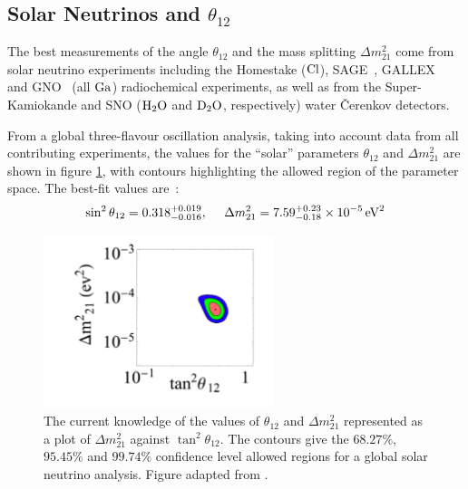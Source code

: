 \subsection{Solar Neutrinos and \texorpdfstring{$\theta_{12}$}{θ₁₂}}
The best measurements of the angle $\theta_{12}$ and the mass splitting $\Delta m^2_{21}$ come from solar neutrino experiments including the Homestake ($\mathrm{Cl}$), SAGE~\citep{SAGE2002}, GALLEX~\citep{GALLEX1999} and GNO~\citep{GNO2005} (all $\mathrm{Ga}$) radiochemical experiments, as well as from the Super-Kamiokande and SNO ($\mathrm{H}_2\mathrm{O}$ and $\mathrm{D}_2\mathrm{O}$, respectively) water Čerenkov detectors.

From a global three-flavour oscillation analysis, taking into account data from all contributing experiments, the values for the ``solar'' parameters $\theta_{12}$ and $\Delta m^2_{21}$ are shown in figure \ref{fig:theta_12_confidence}, with contours highlighting the allowed region of the parameter space. The best-fit values are~\citep{Mezzetto2010}:
\begin{equation}\label{eqn:solar_parameters}
\sin^2 \theta_{12} = 0.318^{+0.019}_{-0.016} , ~~~~ \Delta m^2_{21} =  7.59^{+0.23}_{-0.18} \times 10^{-5} \,\mathrm{eV}^2
\end{equation}

\begin{figure}
\centering
\includegraphics[width=0.6\textwidth]{chapters/neutrinophysics_images/theta_12}
\caption[Allowed region for $\theta_{12}$ and $\Delta m^2_{21}$]{\label{fig:theta_12_confidence}The current knowledge of the values of $\theta_{12}$ and $\Delta m^2_{21}$ represented as a plot of $\Delta m^2_{21}$ against $\tan^2\theta_{12}$. The contours give the $68.27\%$, $95.45\%$ and $99.74\%$ confidence level allowed regions for a global solar neutrino analysis. Figure adapted from \citep{Bellini2012}.}
\end{figure}

